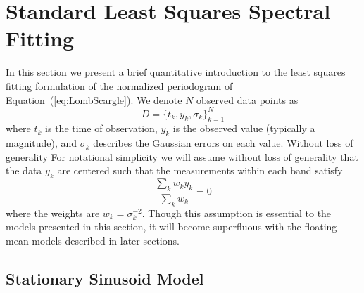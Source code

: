 \documentclass{emulateapj}
\newcommand{\Eq}[1]{Equation~(\ref{eq:#1})}
\newcommand{\eq}[1]{\Eq{#1}}
\newcommand{\eqlabel}[1]{\label{eq:#1}}
\newcommand{\sectlabel}[1]{\label{sect:#1}}
\newcommand{\new}[1]{{\color{red} #1}}
\newcommand{\old}[1]{{\sout{#1}}}
\begin{document}
\section{Standard Least Squares Spectral Fitting}
\sectlabel{standard_least_squares}
In this section we present a brief quantitative introduction to the least squares fitting formulation of the normalized periodogram of \eq{LombScargle}. We denote $N$ observed data points as
\begin{equation}
  D = \{t_k, y_k, \sigma_k\}_{k=1}^N
\end{equation}
where $t_k$ is the time of observation, $y_k$ is the observed value (typically a magnitude), and $\sigma_k$ describes the Gaussian errors on each value. \old{Without loss of generality} \new{For notational simplicity} we will assume \new{without loss of generality} that the data $y_k$ are centered such that the measurements within each band satisfy
\begin{equation}
  \eqlabel{ycentered}
  \frac{\sum_k w_ky_k}{\sum_k w_k} = 0
\end{equation}
where the weights are $w_k = \sigma_k^{-2}$.
\new{Though this assumption is essential to the models presented in this section, it will become superfluous with the floating-mean models described in later sections.}

\subsection{Stationary Sinusoid Model}
\end{document}

